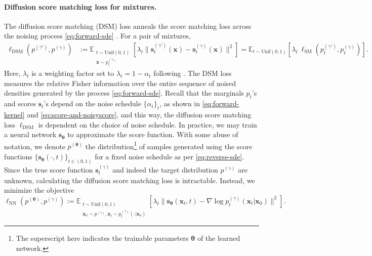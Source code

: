 \documentclass[11pt]{article}
\newcommand{\vect}[1]{\mathbf{#1}}
\theoremstyle{plain}
\newcommand{\1}{\mathbbm{1}}
\newcommand{\btheta}{{\boldsymbol{\theta}}}
\newcommand{\vx}{\vect{x}}
\newcommand{\vs}{\vect{s}}
\newcommand{\ldsm}{\ell_\mathrm{DSM}}
\newcommand{\lsm}{\ell_\mathrm{SM}}
\newcommand{\lnn}{\ell_{\mathrm{NN}}}
\newcommand{\pdist}[2][]{p_{#1}^{(#2)}}
\newcommand{\score}[2][]{\vect{s}_{#1}^{(#2)}}
\begin{document}
\paragraph{Diffusion score matching loss for mixtures.} 
The diffusion score matching (DSM) loss anneals the score matching loss across the noising process \eqref{eq:forward-sde} \citep{song2019generative}. For a pair of mixtures, %
\begin{align}
    \ldsm( \pdist{\gamma'},\pdist{\gamma}) &:=  \mathbb{E}_{\substack{t \sim \mathrm{Unif}(0,1)\\\vx\sim \pdist[t]{\gamma}}}[\lambda_t \|\score[t]{\gamma'}(\vx) - \score[t]{\gamma}(\vx)\|^2] 
    = \mathbb{E}_{t \sim \mathrm{Unif}(0,1)}[\lambda_t \: \lsm(\pdist[t]{\gamma'},\pdist[t]{\gamma})].  \label{eq:diffScoreMatchingLoss}
\end{align}
Here, $\lambda_t$ is a weighting factor set to $\lambda_t = 1-\alpha_t$ following \citet{song2021scorebasedgenerativemodelingstochastic}. The DSM loss measures the relative Fisher information over the entire sequence of noised densities generated by the process \eqref{eq:forward-sde}. Recall that the marginals $p_t$'s and scores $\vs_t$'s depend on the noise schedule $\{\alpha_t\}_t$, as shown in \eqref{eq:forward-kernel} and \eqref{eq:score-and-noisyscore}, and this way, the diffusion score matching loss $\ldsm$ is dependent on the choice of noise schedule. %
In practice, %
we may train a neural network $\vs_{\btheta}$ to approximate the score function. With some abuse of notation, we denote $\pdist{\btheta}$ the distribution\footnote{The superscript here indicates the trainable parameters $\btheta$ of the learned network.} of samples generated using the score functions $\{\vs_{\btheta}(\cdot, t)\}_{t\in (0,1)}$ for a fixed noise schedule as per \eqref{eq:reverse-sde}. Since the true score function $\score[t]{\gamma}$ and indeed the target distribution $\pdist{\gamma}$ are unknown,  calculating the diffusion score matching loss %
is intractable. %
Instead, we minimize the objective 
\begin{equation}\label{eqn: neural network loss}
\lnn(\pdist{\btheta}, \pdist{\gamma}):=\mathbb{E}_{\substack{t \sim \mathrm{Unif}(0,1)\\\vx_0\sim \pdist{\gamma}, \vx_t\sim \pdist[t]{\gamma}(\cdot | \vx_0)}}[\lambda_t \|\vect \vs_{\btheta}(\vx_t, t) - \nabla \log \pdist[t]{\gamma}(\vx_t|\vx_0)\|^2].
\end{equation}
\end{document}
